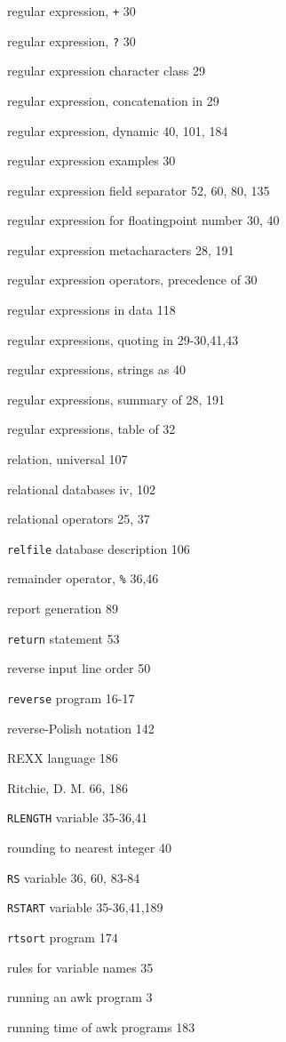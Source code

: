 \begin{multicols}{3}
regular expression, \verb'+' 30

regular expression, \verb'?' 30

regular expression character class 29

regular expression, concatenation in 29

regular expression, dynamic 40, 101, 184

regular expression examples 30

regular expression field separator 52, 60, 80, 135

regular expression for floatingpoint number 30, 40



regular expression metacharacters 28, 191

regular expression operators, precedence of 30

regular expressions in data 118

regular expressions, quoting in 29-30,41,43

regular expressions, strings as 40

regular expressions, summary of 28, 191

regular expressions, table of 32

relation, universal 107

relational databases iv, 102

relational operators 25, 37

\verb'relfile' database description 106

remainder operator, \verb'%' 36,46

report generation 89

\verb'return' statement 53

reverse input line order 50

\verb'reverse' program 16-17

reverse-Polish notation 142

REXX language 186

Ritchie, D. M. 66, 186

\verb'RLENGTH' variable 35-36,41

rounding to nearest integer 40

\verb'RS' variable 36, 60, 83-84

\verb'RSTART' variable 35-36,41,189

\verb'rtsort' program 174

rules for variable names 35

running an awk program 3

running time of awk programs 183


\end{multicols}
